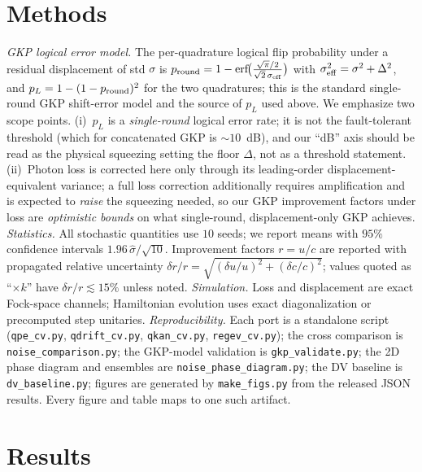 \documentclass[aps,prxquantum,reprint,superscriptaddress,nofootinbib]{revtex4-2}
\begin{document}
\section{Methods}\label{sec:methods}
\emph{GKP logical error model.} The per-quadrature logical flip probability
under a residual displacement of std $\sigma$ is
$p_{\rm round}=1-\mathrm{erf}\!\big(\tfrac{\sqrt\pi/2}{\sqrt2\,\sigma_{\rm eff}}\big)$
with $\sigma_{\rm eff}^2=\sigma^2+\Delta^2$, and
$p_L=1-(1-p_{\rm round})^{2}$ for the two quadratures; this is the standard
single-round GKP shift-error model and the source of $p_L$ used above. We
emphasize two scope points. (i)~$p_L$ is a \emph{single-round} logical error
rate; it is not the fault-tolerant threshold (which for concatenated GKP is
$\sim10$~dB), and our ``dB'' axis should be read as the physical squeezing
setting the floor $\Delta$, not as a threshold statement. (ii)~Photon loss is
corrected here only through its leading-order displacement-equivalent variance;
a full loss correction additionally requires amplification and is expected to
\emph{raise} the squeezing needed, so our GKP improvement factors under loss
are \emph{optimistic bounds} on what single-round, displacement-only GKP
achieves.
\emph{Statistics.} All stochastic quantities use $10$ seeds; we report means
with $95\%$ confidence intervals $1.96\,\hat\sigma/\sqrt{10}$. Improvement
factors $r=u/c$ are reported with propagated relative uncertainty
$\delta r/r=\sqrt{(\delta u/u)^2+(\delta c/c)^2}$; values quoted as ``$\times k$''
have $\delta r/r\lesssim 15\%$ unless noted.
\emph{Simulation.} Loss and displacement are exact Fock-space channels;
Hamiltonian evolution uses exact diagonalization or precomputed step
unitaries. \emph{Reproducibility.} Each port is a standalone script
(\texttt{qpe\_cv.py}, \texttt{qdrift\_cv.py}, \texttt{qkan\_cv.py},
\texttt{regev\_cv.py}); the cross comparison is \texttt{noise\_comparison.py};
the GKP-model validation is \texttt{gkp\_validate.py}; the 2D phase diagram and
ensembles are \texttt{noise\_phase\_diagram.py}; the DV baseline is
\texttt{dv\_baseline.py}; figures are generated by \texttt{make\_figs.py} from
the released JSON results. Every figure and table maps to one such artifact.

\section{Results}
\end{document}
